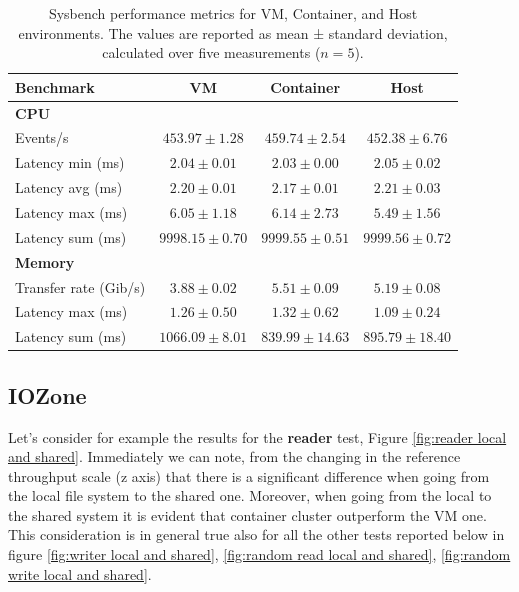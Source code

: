 \begin{table}[htbp]
    \centering
    \begin{tabular}{lccc}
    \toprule
    \textbf{Benchmark} & \textbf{VM} & \textbf{Container} & \textbf{Host} \\
    \midrule
    \textbf{CPU} & & & \\
    Events/s & $453.97 \pm 1.28$ & $459.74 \pm 2.54$ & $452.38 \pm 6.76$ \\
    Latency min (ms) & $2.04 \pm 0.01$ & $2.03 \pm 0.00$ & $2.05 \pm 0.02$ \\
    Latency avg (ms) & $2.20 \pm 0.01$ & $2.17 \pm 0.01$ & $2.21 \pm 0.03$ \\
    Latency max (ms) & $6.05 \pm 1.18$ & $6.14 \pm 2.73$ & $5.49 \pm 1.56$ \\
    Latency sum (ms) & $9998.15 \pm 0.70$ & $9999.55 \pm 0.51$ & $9999.56 \pm 0.72$ \\
    \midrule
    \textbf{Memory} & & & \\
    Transfer rate (Gib/s) & $3.88 \pm 0.02$ & $5.51 \pm 0.09$ & $5.19 \pm 0.08$ \\
    Latency max (ms) & $1.26 \pm 0.50$ & $1.32 \pm 0.62$ & $1.09 \pm 0.24$ \\
    Latency sum (ms) & $1066.09 \pm 8.01$ & $839.99 \pm 14.63$ & $895.79 \pm 18.40$ \\
    \bottomrule

    \end{tabular}
    \caption{Sysbench performance metrics for VM, Container, and Host environments. The values are reported as mean ± standard deviation, calculated over five measurements ($n = 5$).}
    \label{tab:sysbench}
\end{table}


\subsection{IOZone}


Let's consider for example the results for the \textbf{reader} test, Figure \ref{fig:reader local and shared}. Immediately we can note, from the changing in the reference throughput scale (z axis) that there is a significant difference when going from the local file system to the shared one. Moreover, when going from the local to the shared system it is evident that container cluster outperform the VM one. This consideration is in general true also for all the other tests reported below in figure \ref{fig:writer local and shared}, \ref{fig:random read local and shared}, \ref{fig:random write local and shared}.

